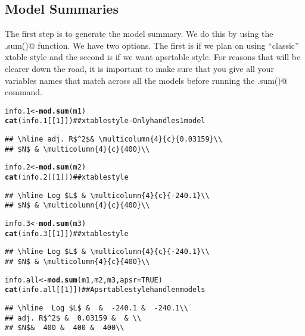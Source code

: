 \documentclass{article}\usepackage{graphicx, color}
\makeatletter
\newcommand{\hlfunctioncall}[1]{\textcolor[rgb]{0.501960784313725,0,0.329411764705882}{\textbf{#1}}}%
\newcommand{\hlcomment}[1]{\textcolor[rgb]{0.180392156862745,0.6,0.341176470588235}{#1}}%
\newenvironment{kframe}{%
 \def\at@end@of@kframe{}%
 \ifinner\ifhmode%
  \def\at@end@of@kframe{\end{minipage}}%
  \begin{minipage}{\columnwidth}%
 \fi\fi%
 \def\FrameCommand##1{\hskip\@totalleftmargin \hskip-\fboxsep
 \colorbox{shadecolor}{##1}\hskip-\fboxsep
     \hskip-\linewidth \hskip-\@totalleftmargin \hskip\columnwidth}%
 \MakeFramed {\advance\hsize-\width
   \@totalleftmargin\z@ \linewidth\hsize
   \@setminipage}}%
 {\par\unskip\endMakeFramed%
 \at@end@of@kframe}
\newenvironment{knitrout}{}{} %
\makeatother
\begin{document}
\subsection{Model Summaries}
The first step is to generate the model summary.  We do this by using the \verb@mod.sum()@ function.  We have two options.  The first is if we plan on using ``classic'' xtable style and the second is if we want apsrtable style.  For reasons that will be clearer down the road, it is important to make sure that you give all your variables names that match across all the models before running the \verb@mod.sum()@ command.
\begin{knitrout}
\color{fgcolor}\begin{kframe}
\begin{alltt}
info.1<-\hlfunctioncall{mod.sum}(m1)
\hlfunctioncall{cat}(info.1[[1]]) \hlcomment{##xtable style--Only handles 1 model}
\end{alltt}
\begin{verbatim}
## \hline adj. R$^2$& \multicolumn{4}{c}{0.03159}\\
## $N$ & \multicolumn{4}{c}{400}\\
\end{verbatim}
\begin{alltt}

info.2<-\hlfunctioncall{mod.sum}(m2)
\hlfunctioncall{cat}(info.2[[1]]) \hlcomment{##xtable style }
\end{alltt}
\begin{verbatim}
## \hline Log $L$ & \multicolumn{4}{c}{-240.1}\\
## $N$ & \multicolumn{4}{c}{400}\\
\end{verbatim}
\begin{alltt}

info.3<-\hlfunctioncall{mod.sum}(m3)
\hlfunctioncall{cat}(info.3[[1]]) \hlcomment{##xtable style }
\end{alltt}
\begin{verbatim}
## \hline Log $L$ & \multicolumn{4}{c}{-240.1}\\
## $N$ & \multicolumn{4}{c}{400}\\
\end{verbatim}
\begin{alltt}

info.all<-\hlfunctioncall{mod.sum}(m1, m2, m3, apsr=TRUE)
\hlfunctioncall{cat}(info.all[[1]]) \hlcomment{##Apsrtable style handle n models}
\end{alltt}
\begin{verbatim}
## \hline  Log $L$ &  &  -240.1 &  -240.1\\
## adj. R$^2$ &  0.03159 &  & \\
## $N$&  400 &  400 &  400\\
\end{verbatim}
\begin{alltt}


\end{alltt}
\end{kframe}
\end{knitrout}
\end{document}
